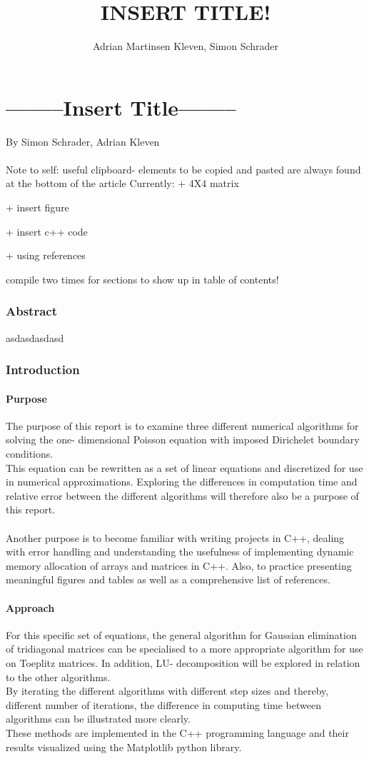 \documentclass[10pt,a4paper]{article}
\author{Adrian Martinsen Kleven, Simon Schrader}
\title{INSERT TITLE!}
\begin{document}
\part*{--------Insert Title--------}
{\large By Simon Schrader, Adrian Kleven}\\\\
Note to self: 
useful clipboard- elements to be copied and pasted are always found at the bottom of the article
Currently:
 + 4X4 matrix 

 + insert figure

 + insert c++ code
 
 + using references
 
 compile two times for sections to show up in table of contents!


\tableofcontents

\listoffigures
\listoftables

 
\clearpage
 
\section{Abstract}
asdasdasdasd
\section{Introduction}
\subsection{Purpose} 
The purpose of this report is to examine three different numerical algorithms for solving the one- dimensional Poisson equation with imposed Dirichelet boundary conditions. \\This equation can be rewritten as a set of linear equations and discretized for use in numerical approximations. Exploring the differences in computation time and relative error between the different algorithms will therefore also be a purpose of this report.\\\\
Another purpose is to become familiar with writing projects in C++, dealing with error handling and understanding the usefulness of implementing dynamic memory allocation of arrays and matrices in C++. Also, to practice presenting meaningful figures and tables as well as a comprehensive list of references.
\subsection{Approach}
For this specific set of equations, the general algorithm for Gaussian elimination of tridiagonal matrices can be specialised to a more appropriate algorithm for use on Toeplitz matrices. In addition, LU- decomposition will be explored in relation to the other algorithms.\\ By iterating the different algorithms with different step sizes and thereby, different number of iterations, the difference in computing time between algorithms can be illustrated more clearly. \\These methods are implemented in the C++ programming language and their results visualized using the Matplotlib python library.
\end{document}
